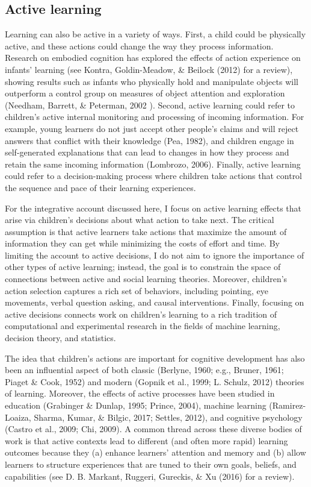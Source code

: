 \documentclass[oneside]{report}
\begin{document}
\subsection{Active learning}\label{active-learning}

Learning can also be active in a variety of ways. First, a child could
be physically active, and these actions could change the way they
process information. Research on embodied cognition has explored the
effects of action experience on infants' learning (see Kontra,
Goldin-Meadow, \& Beilock (2012) for a review), showing results such as
infants who physically hold and manipulate objects will outperform a
control group on measures of object attention and exploration (Needham,
Barrett, \& Peterman, 2002 ). Second, active learning could refer to
children's active internal monitoring and processing of incoming
information. For example, young learners do not just accept other
people's claims and will reject answers that conflict with their
knowledge (Pea, 1982), and children engage in self-generated
explanations that can lead to changes in how they process and retain the
same incoming information (Lombrozo, 2006). Finally, active learning
could refer to a decision-making process where children take actions
that control the sequence and pace of their learning experiences.

For the integrative account discussed here, I focus on active learning
effects that arise via children's decisions about what action to take
next. The critical assumption is that active learners take actions that
maximize the amount of information they can get while minimizing the
costs of effort and time. By limiting the account to active decisions, I
do not aim to ignore the importance of other types of active learning;
instead, the goal is to constrain the space of connections between
active and social learning theories. Moreover, children's action
selection captures a rich set of behaviors, including pointing, eye
movements, verbal question asking, and causal interventions. Finally,
focusing on active decisions connects work on children's learning to a
rich tradition of computational and experimental research in the fields
of machine learning, decision theory, and statistics.

The idea that children's actions are important for cognitive development
has also been an influential aspect of both classic (Berlyne, 1960;
e.g., Bruner, 1961; Piaget \& Cook, 1952) and modern (Gopnik et al.,
1999; L. Schulz, 2012) theories of learning. Moreover, the effects of
active processes have been studied in education (Grabinger \& Dunlap,
1995; Prince, 2004), machine learning (Ramirez-Loaiza, Sharma, Kumar, \&
Bilgic, 2017; Settles, 2012), and cognitive psychology (Castro et al.,
2009; Chi, 2009). A common thread across these diverse bodies of work is
that active contexts lead to different (and often more rapid) learning
outcomes because they (a) enhance learners' attention and memory and (b)
allow learners to structure experiences that are tuned to their own
goals, beliefs, and capabilities (see D. B. Markant, Ruggeri, Gureckis,
\& Xu (2016) for a review).
\end{document}
